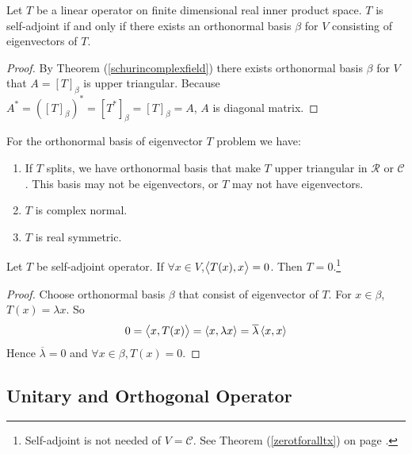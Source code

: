 \begin{theorem}
    Let $T$ be a linear operator on finite dimensional real inner product space. $T$ is self-adjoint if and only if there exists an orthonormal basis $\beta$ for $V$ consisting of eigenvectors of $T$.    
\end{theorem}
\begin{proof}
    By Theorem (\ref{schurincomplexfield}) there exists orthonormal basis $\beta$ for $V$ that $A = [T]_\beta$ is upper triangular. Because $A^* = ([T]_\beta)^* = [T^*]_\beta = [T]_\beta = A$, $A$ is diagonal matrix.
\end{proof}


\begin{theorem}
    For the orthonormal basis of eigenvector $T$ problem we have:
    \begin{enumerate}
        \item If $T$ splits, we have orthonormal basis that make $T$ upper triangular in $\mathcal{R}$ or $\mathcal{C}$. This basis may not be eigenvectors, or $T$ may not have eigenvectors.
        \item $T$ is complex normal.
        \item $T$ is real symmetric.
    \end{enumerate}
\end{theorem}


\begin{theorem}\label{zerotforalltxforselfadjoint}
    Let $T$ be self-adjoint operator. If $\forall x \in V$,$\left\langle \displaystyle T(x), x \right\rangle = 0$. Then $T = 0$.\footnote{Self-adjoint is not needed of $V=\mathcal{C}$. See Theorem (\ref{zerotforalltx}) on page \pageref{zerotforalltx}.}
\end{theorem}
\begin{proof}
    Choose orthonormal basis $\beta$ that consist of eigenvector of $T$. For $x\in \beta$, $T(x) =\lambda x$. So
    \begin{equation*}
        0 = \left\langle \displaystyle x, T(x) \right\rangle = \left\langle \displaystyle x, \lambda x \right\rangle = \overline{\lambda} \left\langle \displaystyle x, x \right\rangle
    \end{equation*}
    Hence $\overline{\lambda} = 0$ and $\forall x \in \beta,  T(x) = 0$.
\end{proof}



\subsection{Unitary and Orthogonal Operator}

